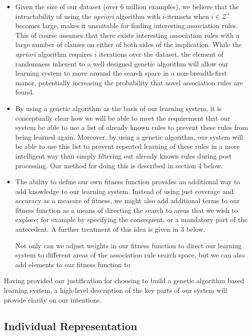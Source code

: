 \documentclass{amsart}
\theoremstyle{definition}
\theoremstyle{remark}
\numberwithin{equation}{section}
\begin{document}
\begin{itemize}
	\item {} Given the size of our dataset (over 6 million examples), we believe that the intractability of using the \textit{apriori} algorithm with $i$-itemsets when $i\in \mathcal{Z}^+$ becomes large, makes it unsuitable for finding interesting association rules. This of course assumes that there exists interesting association rules with a large number of clauses on either of both sides of the implication. While the \textit{apriori} algorithm requires $i$ iterations over the dataset, the element of randomness inherent to a well designed genetic algorithm will allow our learning system to move around the search space in a non-breadth-first manor, potentially increasing the probability that novel association rules are found.  
	\item By using a genetic algorithm as the basis of our learning system, it is conceptually clear how we will be able to meet the requirement that our system be able to use a list of already known rules to prevent these rules from being learned again. Moreover, by using a genetic algorithm, our system will be able to use this list to prevent repeated learning of these rules in a more intelligent way than simply filtering out already known rules during post processing. Our method for doing this is described in section 4 below. 
	\item The ability to define our own fitness function provides an additional way to add knowledge to our learning system. Instead of using just coverage and accuracy as a measure of fitness, we might also add additional terms to our fitness function as a means of directing the search to areas that we wish to explore; for example by specifying the consequent, or a mandatory part of the antecedent. A further treatment of this idea is given in 3 below.
	
	Not only can we adjust weights in our fitness function to direct our learning system to different areas of the association rule search space, but we can also add elements to our fitness function to 
\end{itemize}

Having provided our justification for choosing to build a genetic algorithm based learning system, a high-level description of the key parts of our system will provide clarity on our intentions. 

\subsection{Individual Representation}
\end{document}
